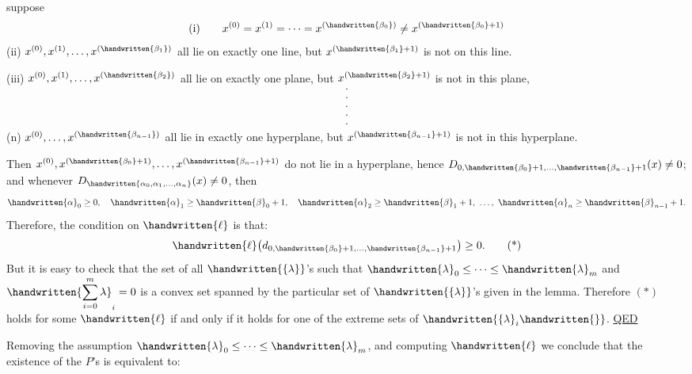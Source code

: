 suppose
\[
 \text{(i)}\qquad x^{(0)}=x^{(1)}=\cdots=x^{(\handwritten{\beta_0})}\ne x^{(\handwritten{\beta_0}+1)}
\]
(ii) $x^{(0)},x^{(1)},\ldots,x^{(\handwritten{\beta_1})}$ all lie on exactly one line, but
$x^{(\handwritten{\beta_1}+1)}$ is not on this line.

(iii) $x^{(0)},x^{(1)},\ldots,x^{(\handwritten{\beta_2})}$ all lie on exactly one plane, but
$x^{(\handwritten{\beta_2}+1)}$ is not in this plane,
\[
\substack{\cdot\\\cdot\\\cdot\\\cdot\\\cdot}
\]
(n) $x^{(0)},\ldots,x^{(\handwritten{\beta_{n-1}})}$ all lie in exactly one hyperplane, but
$x^{(\handwritten{\beta_{n-1}}+1)}$ is not in this hyperplane.

Then $x^{(0)},x^{(\handwritten{\beta_0}+1)},\ldots,x^{(\handwritten{\beta_{n-1}}+1)}$ do not lie in a hyperplane, hence
$D_{0,\handwritten{\beta_0}+1,\ldots,\handwritten{\beta_{n-1}}+1}(x)\ne0$; and whenever $D_{\handwritten{\alpha_0,\alpha_1,\ldots,\alpha_n}}(x)\ne0$, then
\[
 \handwritten{\alpha}_0\geq0,\quad\handwritten{\alpha}_1\geq\handwritten{\beta}_0+1,\quad
 \handwritten{\alpha}_2\geq\handwritten{\beta}_1+1,\ \ldots,\ \handwritten{\alpha}_n\geq\handwritten{\beta}_{n-1}+1.
\]
Therefore, the condition on $\handwritten{\ell}$ is that:
\begingroup\makeatletter\tagsleft@true\makeatother
\[
 \handwritten{\ell}\bigl(d_{0,\handwritten{\beta_0}+1,\ldots,\handwritten{\beta_{n-1}}+1}\bigr)\geq0.\tag*{(*)}
\]
\endgroup
But it is easy to check that the set of all $\handwritten{\{\lambda\}}$'s such that $\handwritten{\lambda}_0\leq\cdots\leq\handwritten{\lambda}_m$
and $\displaystyle\handwritten{\sum_{i=0}^{m}\lambda}_i=0$ is a convex set spanned by the particular set of
$\handwritten{\{\lambda\}}$'s given in the lemma. Therefore $(*)$ holds for some $\handwritten{\ell}$ if and only
if it holds for one of the extreme sets of $\handwritten{\{\lambda}_i\handwritten{\}}$. \quad\uline{QED}

Removing the assumption $\handwritten{\lambda}_0\leq\cdots\leq\handwritten{\lambda}_m$, and computing $\handwritten{\ell}$ we
conclude that the existence of the $P$'s is equivalent to:

